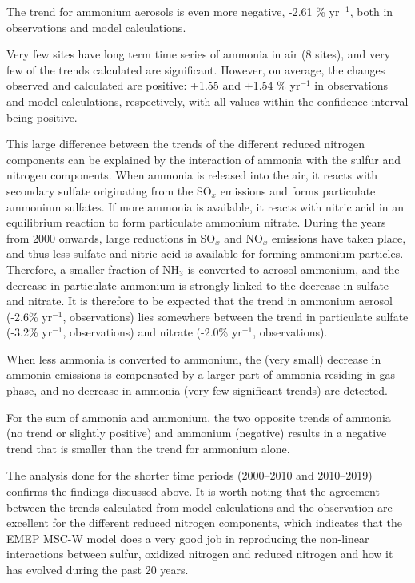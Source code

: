 The trend for ammonium aerosols is even more negative, -2.61 \% yr$^{-1}$, both in observations and model calculations.

Very few sites have long term time series of ammonia in air (8 sites), and very few of the trends calculated are significant. However, on average, the changes observed and calculated are positive: +1.55 and +1.54 \% yr$^{-1}$ in observations and model calculations, respectively, with all values within the confidence interval being positive.


This large difference between the trends of the different reduced nitrogen components can be explained by the interaction of ammonia with the sulfur and nitrogen components. When ammonia is released into the air, it reacts with secondary sulfate originating from the SO$_x$ emissions and forms particulate ammonium sulfates. If more ammonia is available, it reacts with nitric acid in an equilibrium reaction to form particulate ammonium nitrate. During the years from 2000 onwards, large reductions in SO$_x$ and NO$_x$ emissions have taken place, and thus less sulfate and nitric acid is available for forming ammonium particles. Therefore, a smaller fraction of NH$_3$ is converted to aerosol ammonium, and the decrease in particulate ammonium is strongly linked to the decrease in sulfate and nitrate. It is therefore to be expected that the trend in ammonium aerosol (-2.6\% yr$^{-1}$, observations) lies somewhere between the trend in particulate sulfate (-3.2\% yr$^{-1}$, observations) and nitrate (-2.0\% yr$^{-1}$, observations). 

When less ammonia is converted to ammonium, the (very small) decrease in ammonia emissions is compensated by a larger part of ammonia residing in gas phase, and no decrease in ammonia (very few significant trends) are detected.

For the sum of ammonia and ammonium, the two opposite trends of ammonia (no trend or slightly positive) and ammonium (negative) results in a negative trend that is smaller than the trend for ammonium alone.

The analysis done for the shorter time periods (2000--2010 and 2010--2019) confirms the findings discussed above. It is worth noting that the agreement between the trends calculated from model calculations and the observation are excellent for the different reduced nitrogen components, which indicates that the EMEP MSC-W model does a very good job in reproducing the non-linear interactions between sulfur, oxidized nitrogen and reduced nitrogen and how it has evolved during the past 20 years.

